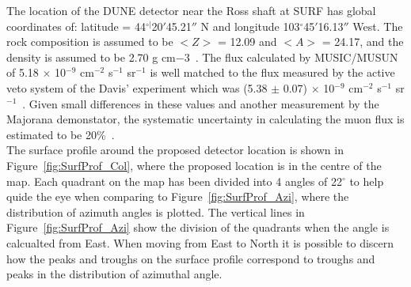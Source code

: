 The location of the DUNE detector near the Ross shaft at SURF has global coordinates of: latitude = 44$^{\circ|}$20$'$45.21$''$ N and longitude 103$^{\circ}$45$'$16.13$''$ West. The rock composition is assumed to be $< Z >$ = 12.09 and $< A >$ = 24.17, and the density is assumed to be 2.70 g cm${-3}$~\citep{Mei:2009py}. The flux calculated by MUSIC/MUSUN of 5.18 $\times$ 10$^{-9}$ cm$^{-2}$ s$^{-1}$ sr$^{-1}$ is well matched to the flux measured by the active veto system of the Davis' experiment which was (5.38 $\pm$ 0.07) $\times$ 10$^{-9}$ cm$^{-2}$ s$^{-1}$ sr$^{-1}$~\citep{PhysRevD.27.1444}. Given small differences in these values and another measurement by the Majorana demonstator, the systematic uncertainty in calculating the muon flux is estimated to be 20\%~\citep{NDKTFNote}. \\

The surface profile around the proposed detector location is shown in Figure~\ref{fig:SurfProf_Col}, where the proposed location is in the centre of the map. Each quadrant on the map has been divided into 4 angles of 22$^{\circ}$ to help quide the eye when comparing to Figure~\ref{fig:SurfProf_Azi}, where the distribution of azimuth angles is plotted. The vertical lines in Figure~\ref{fig:SurfProf_Azi} show the division of the quadrants when the angle is calcualted from East. When moving from East to North it is possible to discern how the peaks and troughs on the surface profile correspond to troughs and peaks in the distribution of azimuthal angle. \\

